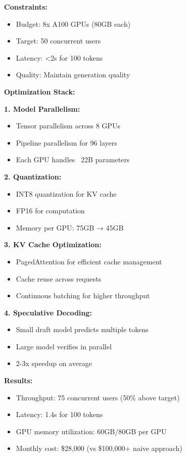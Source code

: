 \textbf{Constraints:}
\begin{itemize}
    \item Budget: 8x A100 GPUs (80GB each)
    \item Target: 50 concurrent users
    \item Latency: <2s for 100 tokens
    \item Quality: Maintain generation quality
\end{itemize}

\textbf{Optimization Stack:}

\textbf{1. Model Parallelism:}
\begin{itemize}
    \item Tensor parallelism across 8 GPUs
    \item Pipeline parallelism for 96 layers
    \item Each GPU handles ~22B parameters
\end{itemize}

\textbf{2. Quantization:}
\begin{itemize}
    \item INT8 quantization for KV cache
    \item FP16 for computation
    \item Memory per GPU: 75GB → 45GB
\end{itemize}

\textbf{3. KV Cache Optimization:}
\begin{itemize}
    \item PagedAttention for efficient cache management
    \item Cache reuse across requests
    \item Continuous batching for higher throughput
\end{itemize}

\textbf{4. Speculative Decoding:}
\begin{itemize}
    \item Small draft model predicts multiple tokens
    \item Large model verifies in parallel
    \item 2-3x speedup on average
\end{itemize}

\textbf{Results:}
\begin{itemize}
    \item Throughput: 75 concurrent users (50\% above target)
    \item Latency: 1.4s for 100 tokens
    \item GPU memory utilization: 60GB/80GB per GPU
    \item Monthly cost: \$28,000 (vs \$100,000+ naive approach)
\end{itemize}

